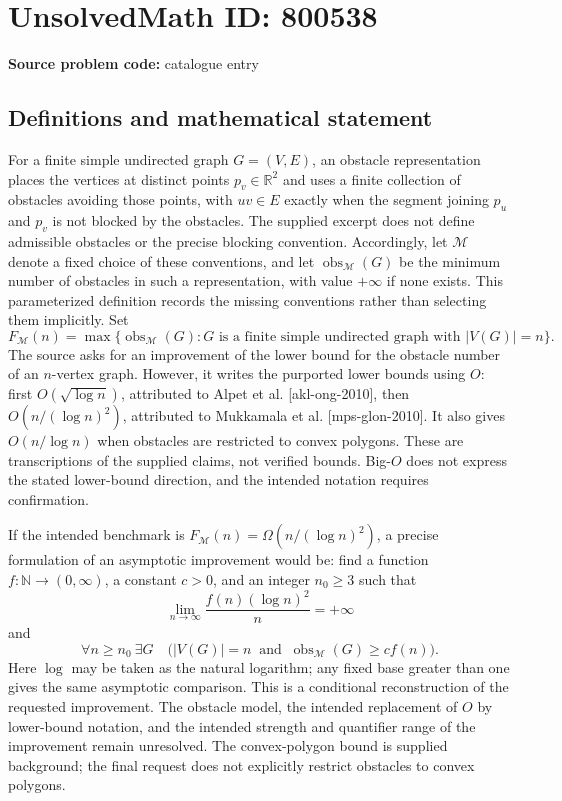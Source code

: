 \documentclass[11pt]{article}
\newcommand{\N}{\mathbb{N}}
\newcommand{\R}{\mathbb{R}}
\begin{document}
\section*{UnsolvedMath ID: 800538}
\textbf{Source problem code:} catalogue entry
\subsection{Definitions and mathematical statement}
For a finite simple undirected graph \(G=(V,E)\), an obstacle representation places the vertices at distinct points \(p_v\in\R^2\) and uses a finite collection of obstacles avoiding those points, with \(uv\in E\) exactly when the segment joining \(p_u\) and \(p_v\) is not blocked by the obstacles. The supplied excerpt does not define admissible obstacles or the precise blocking convention. Accordingly, let \(\mathcal M\) denote a fixed choice of these conventions, and let \(\operatorname{obs}_{\mathcal M}(G)\) be the minimum number of obstacles in such a representation, with value \(+\infty\) if none exists. This parameterized definition records the missing conventions rather than selecting them implicitly. Set
\[
F_{\mathcal M}(n)=\max\{\operatorname{obs}_{\mathcal M}(G):G\text{ is a finite simple undirected graph with }|V(G)|=n\}.
\]
The source asks for an improvement of the lower bound for the obstacle number of an \(n\)-vertex graph. However, it writes the purported lower bounds using \(O\): first \(O(\sqrt{\log n})\), attributed to Alpet et al. [akl-ong-2010], then \(O(n/(\log n)^2)\), attributed to Mukkamala et al. [mps-glon-2010]. It also gives \(O(n/\log n)\) when obstacles are restricted to convex polygons. These are transcriptions of the supplied claims, not verified bounds. Big-\(O\) does not express the stated lower-bound direction, and the intended notation requires confirmation.

If the intended benchmark is \(F_{\mathcal M}(n)=\Omega(n/(\log n)^2)\), a precise formulation of an asymptotic improvement would be: find a function \(f:\N\to(0,\infty)\), a constant \(c>0\), and an integer \(n_0\geq 3\) such that
\[
\lim_{n\to\infty}\frac{f(n)(\log n)^2}{n}=+\infty
\]
and
\[
\forall n\geq n_0\ \exists G\quad
\bigl(|V(G)|=n\ \text{ and }\ \operatorname{obs}_{\mathcal M}(G)\geq c f(n)\bigr).
\]
Here \(\log\) may be taken as the natural logarithm; any fixed base greater than one gives the same asymptotic comparison. This is a conditional reconstruction of the requested improvement. The obstacle model, the intended replacement of \(O\) by lower-bound notation, and the intended strength and quantifier range of the improvement remain unresolved. The convex-polygon bound is supplied background; the final request does not explicitly restrict obstacles to convex polygons.
\end{document}
